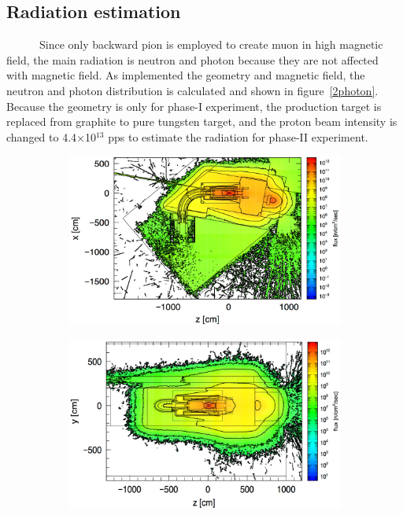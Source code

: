   \subsection{Radiation estimation}
~~~~~~Since only backward pion is employed to create muon in high magnetic field, the main radiation is neutron and photon because they are not affected with magnetic field.
As implemented the geometry and magnetic field, the neutron and photon distribution is calculated and shown in figure~\ref{2photon}.
Because the geometry is only for phase-I experiment, the production target is replaced from graphite to pure tungsten target, and the proton beam intensity is changed to 4.4$\times$10$^{13}$ pps to estimate the radiation for phase-II experiment.
\begin{figure}[H]
   \begin{subfigure}{0.3\textwidth}
    \centering
    \includegraphics[scale=0.32]{chapter3/fig/neutronzx.pdf}
   \end{subfigure}
   \hspace{0.2\textwidth}
   \begin{subfigure}{0.3\textwidth}
    \centering
	\includegraphics[scale=0.32]{chapter3/fig/neutronzy.pdf}
   \end{subfigure}
  \end{figure}
